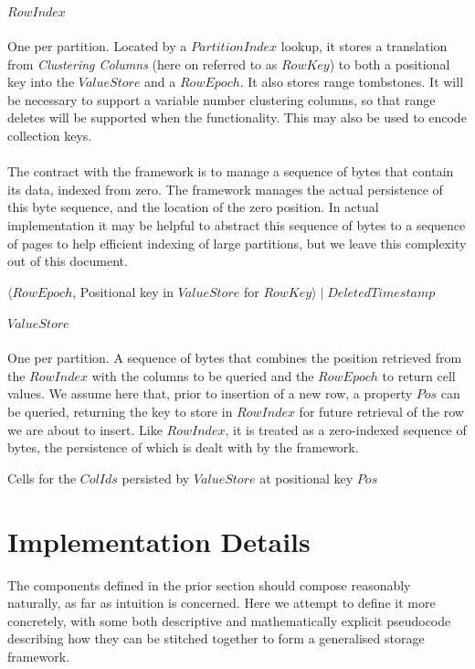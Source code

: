 \documentclass[fleqn]{article}
\begin{document}
\clearpage
\subparagraph{$RowIndex$}
\subparagraph{}
    One per partition. Located by a $PartitionIndex$ lookup, it stores a translation from \textit{Clustering Columns}
    (here on referred to as $RowKey$) to both a positional key into the $ValueStore$ and a $RowEpoch$. It also
    stores range tombstones. It will be necessary to support a variable number clustering columns, so that
    range deletes will be supported when the functionality. This may also be used to encode collection keys. 
    \\\\
    The contract with the framework is to manage 
    a sequence of bytes that contain its data, indexed from zero. The framework manages the actual persistence 
    of this byte sequence, and the location of the zero position. In actual implementation it may be helpful 
    to abstract this sequence of bytes to a sequence of pages to help efficient indexing of large partitions, 
    but we leave this complexity out of this document.
    \\
    \begin{algorithmic}[2]
    \scriptsize
    \Statex \Return $\langle RowEpoch$, Positional key in $ValueStore$ for $RowKey\rangle \mid DeletedTimestamp$
    \EndFunction
    \end{algorithmic}

\subparagraph{$ValueStore$}
\subparagraph{}
    One per partition. A sequence of bytes that combines the position retrieved from the $RowIndex$ with the 
    columns to be queried and the $RowEpoch$ to return cell values. We assume here that, prior to insertion of 
    a new row, a property $Pos$ can be queried, returning the key to store in $RowIndex$ 
    for future retrieval of the row we are about to insert.
    Like $RowIndex$, it is treated as a zero-indexed sequence of bytes, the persistence of which is dealt 
    with by the framework.
    \\
    \begin{algorithmic}[2]
    \scriptsize
    \Statex \Return Cells for the $ColIds$ persisted by $ValueStore$ at positional key $Pos$
    \EndFunction
    \end{algorithmic}

\paragraph{}
\section{Implementation Details}
\small
The components defined in the prior section should compose reasonably naturally, as far as intuition
is concerned. Here we attempt to define it more concretely, with some both descriptive and mathematically
explicit pseudocode describing how they can be stitched together to form a generalised storage framework.
\\
\end{document}
